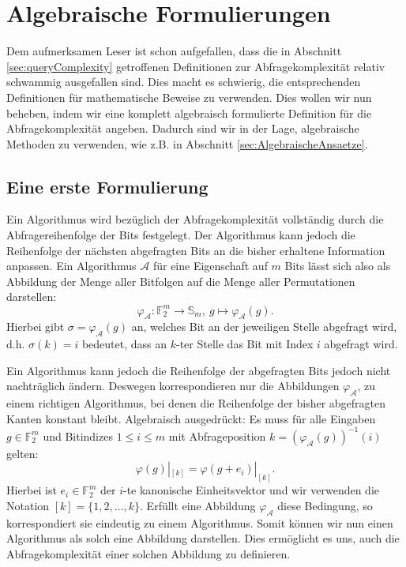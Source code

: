 \documentclass[10pt,a4paper, footheight=1mm]{scrreprt}
\theoremstyle{definition}
\begin{document}
\section{Algebraische Formulierungen}
Dem aufmerksamen Leser ist schon aufgefallen, dass die in 
Abschnitt \ref{sec:queryComplexity} getroffenen Definitionen
zur Abfragekomplexität relativ schwammig ausgefallen sind.
Dies macht es schwierig, die entsprechenden Definitionen
für mathematische Beweise zu verwenden.
Dies wollen wir nun beheben, indem wir eine komplett algebraisch
formulierte Definition für die Abfragekomplexität angeben.
Dadurch sind wir in der Lage, algebraische Methoden zu verwenden,
wie z.B. in Abschnitt \ref{sec:AlgebraischeAnsaetze}.

\subsection{Eine erste Formulierung}
\label{sec:AlgebraischeCharakterisierung}
Ein Algorithmus wird bezüglich der Abfragekomplexität vollständig
durch die Abfragereihenfolge der Bits festgelegt.
Der Algorithmus kann jedoch die Reihenfolge der nächsten
abgefragten Bits an die bisher erhaltene Information anpassen.
Ein Algorithmus $\mathcal{A}$ für eine Eigenschaft
auf $m$ Bits lässt sich also als Abbildung der Menge aller
Bitfolgen auf die Menge aller Permutationen darstellen:
$$ \varphi_\mathcal{A}: \mathbb{F}_2^m \to \mathbb{S}_m,
   ~g \mapsto \varphi_\mathcal{A}(g).$$
Hierbei gibt $\sigma = \varphi_\mathcal{A}(g)$ an, welches
Bit an der jeweiligen Stelle abgefragt wird,
d.h. $\sigma(k)=i$ bedeutet, dass an $k$-ter
Stelle das Bit mit Index $i$ abgefragt wird.

Ein Algorithmus kann jedoch die Reihenfolge der 
abgefragten Bits jedoch nicht nachträglich ändern. Deswegen
korrespondieren nur die Abbildungen $\varphi_\mathcal{A}$,
zu einem richtigen Algorithmus, bei denen die Reihenfolge
der bisher abgefragten Kanten konstant bleibt.
Algebraisch ausgedrückt: Es muss für alle Eingaben
$g\in \mathbb{F}_2^m$ und Bitindizes $1\leq i \leq m$
mit Abfrageposition $k=(\varphi_\mathcal{A}(g))^{-1}(i)$
gelten:
\begin{equation}
\label{eq:NichtNachtraeglichAendern}
\varphi(g)|_{[k]} = \varphi(g+e_i)|_{[k]}.
\end{equation}
Hierbei ist $e_i\in \mathbb{F}_2^m$
der $i$-te kanonische Einheitsvektor
und wir verwenden die Notation $[k]=\{1,2, \dots, k\}$.
Erfüllt eine Abbildung $\varphi_\mathcal{A}$ diese
Bedingung, so korrespondiert sie eindeutig
zu einem Algorithmus. Somit können wir nun
einen Algorithmus als solch eine Abbildung darstellen.
Dies ermöglicht es uns, auch die Abfragekomplexität
einer solchen Abbildung zu definieren.
\end{document}
